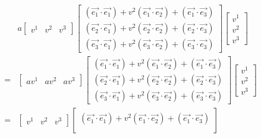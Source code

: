 \documentclass{article}
\begin{document}
\begin{itemize}
\begin{itemize}
			\begin{align*}
				&a\begin{bmatrix}
					v^{1} & v^{2} & v^{3}
				\end{bmatrix}\begin{bmatrix}
					(\overrightarrow{e_{1}}\cdot\overrightarrow{e_{1}}) + {v}^{2}(\overrightarrow{e_{1}}\cdot\overrightarrow{e_{2}}) + (\overrightarrow{e_{1}}\cdot\overrightarrow{e_{3}})\\
					(\overrightarrow{e_{2}}\cdot\overrightarrow{e_{1}}) + {v}^{2}(\overrightarrow{e_{2}}\cdot\overrightarrow{e_{2}}) + (\overrightarrow{e_{2}}\cdot\overrightarrow{e_{3}})\\
					(\overrightarrow{e_{3}}\cdot\overrightarrow{e_{1}}) + {v}^{2}(\overrightarrow{e_{3}}\cdot\overrightarrow{e_{2}}) + (\overrightarrow{e_{3}}\cdot\overrightarrow{e_{3}})
				\end{bmatrix}\begin{bmatrix}
					v^{1}\\
					v^{2}\\
					v^{3}
				\end{bmatrix}\\
			   =& \begin{bmatrix}
			   	av^{1} & av^{2} & av^{3}
			   \end{bmatrix}\begin{bmatrix}
			   	(\overrightarrow{e_{1}}\cdot\overrightarrow{e_{1}}) + {v}^{2}(\overrightarrow{e_{1}}\cdot\overrightarrow{e_{2}}) + (\overrightarrow{e_{1}}\cdot\overrightarrow{e_{3}})\\
			   	(\overrightarrow{e_{2}}\cdot\overrightarrow{e_{1}}) + {v}^{2}(\overrightarrow{e_{2}}\cdot\overrightarrow{e_{2}}) + (\overrightarrow{e_{2}}\cdot\overrightarrow{e_{3}})\\
			   	(\overrightarrow{e_{3}}\cdot\overrightarrow{e_{1}}) + {v}^{2}(\overrightarrow{e_{3}}\cdot\overrightarrow{e_{2}}) + (\overrightarrow{e_{3}}\cdot\overrightarrow{e_{3}})
			   \end{bmatrix}\begin{bmatrix}
			   	v^{1}\\
			   	v^{2}\\
			   	v^{3}
			   \end{bmatrix}\\
		   =& \begin{bmatrix}
		   	v^{1} & v^{2} & v^{3}
		   \end{bmatrix}\begin{bmatrix}
		   	(\overrightarrow{e_{1}}\cdot\overrightarrow{e_{1}}) + {v}^{2}(\overrightarrow{e_{1}}\cdot\overrightarrow{e_{2}}) + (\overrightarrow{e_{1}}\cdot\overrightarrow{e_{3}})\\

\end{bmatrix}
\end{align*}
\end{itemize}
\end{itemize}
\end{document}
